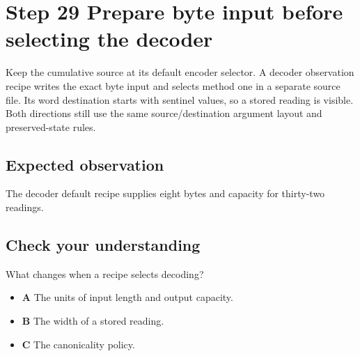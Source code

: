 \section{Step 29 Prepare byte input before selecting the decoder}\label{delta-s29}

Keep the cumulative source at its default encoder selector. A decoder observation recipe writes the exact byte input and selects method one in a separate source file. Its word destination starts with sentinel values, so a stored reading is visible. Both directions still use the same source/destination argument layout and preserved-state rules.

\subsection{Expected observation}
The decoder default recipe supplies eight bytes and capacity for thirty-two readings.

\subsection{Check your understanding}
What changes when a recipe selects decoding?

\begin{itemize}
\item \textbf{A} The units of input length and output capacity.
\item \textbf{B} The width of a stored reading.
\item \textbf{C} The canonicality policy.
\end{itemize}
